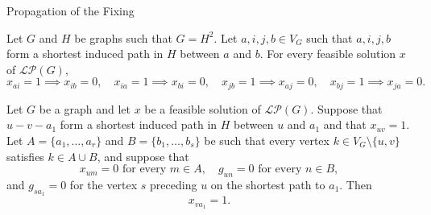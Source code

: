 \documentclass[10pt]{beamer}
\begin{document}
\begin{frame}{Propagation of the Fixing}
    \scriptsize
    \begin{lemma} \label{lemma::0_path_propagation}
        Let $G$ and $H$ be graphs such that $G = H^2$. Let $a,i,j,b \in V_G$ such that $a,i,j,b$ form a shortest induced path in $H$ between $a$ and $b$. For every feasible solution $x$ of $\mathcal{LP}(G)$,
        \[
        x_{ai}=1 \implies x_{ib}=0, \quad x_{ia}=1 \implies x_{bi}=0, \quad x_{jb}=1 \implies x_{aj}=0, \quad x_{bj}=1 \implies x_{ja}=0.
        \]
    \end{lemma}

    \vspace{-0.3em}
    \centering
    \vspace{0.4em}
    \begin{lemma} \label{lemma::1_path_propagation}
        Let $G$ be a graph and let $x$ be a feasible solution of $\mathcal{LP}(G)$. Suppose that $u-v-a_1$ form a shortest induced path in $H$ between $u$ and $a_1$ and that $x_{uv}=1$. Let $A=\{a_1,\ldots,a_r\}$ and $B=\{b_1,\ldots,b_s\}$ be such that every vertex $k \in V_G\setminus\{u,v\}$ satisfies $k \in A\cup B$, and suppose that
        \[
        x_{um}=0 \text{ for every } m \in A, \quad g_{un}=0 \text{ for every } n \in B,
        \]
        and $g_{sa_1}=0$ for the vertex $s$ preceding $u$ on the shortest path to $a_1$. Then
        \[
        x_{va_1}=1.
        \]
    \end{lemma}
\end{frame}
\end{document}
